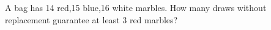 A bag has 14 red,15 blue,16 white marbles. How many draws without replacement guarantee at least 3 red marbles?
